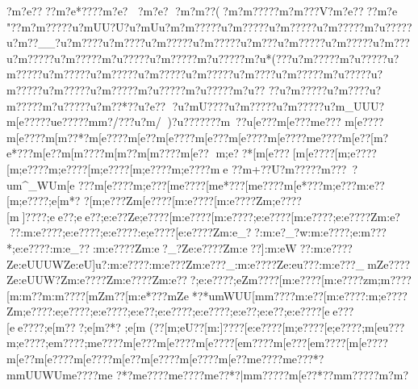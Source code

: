 {{{{{{{{{{{{{{{{{{{{{{{{{{{{{{{{{{{{{{{{{{{{{{{{{{{{{{{{{{{{{{{{{{{{{{{{{{{{{{{{{{{{{{{{{{{{{{{{{{{{{{{{{{{{{{{{{{{{{{{{{{{{{{{{{{{{{{{{{{{{{{{{{{{{{{{{{{{{{{{{{{{{{{{{{{{{{{{{{{{{{{{{{{{{{{{{{{{{{{{{{{{{{{{{{{{{{{{{{{{{{{{{{{{{{{{{{{{{{{{{{{{{{{{{{{{{{{{{{{{{{{{{{{{{{{{{{{{{{{{{{{{{{{{{{{{{{{{{{{{{{{{{{{{{{{{{{{{{{{{{{{{{{{{{{{{{{{{{{{{{{{{{{{{{{{{{{{{{{{{{{{{{{{{{{{{{{{{{{{{{{{{{{{{{{{{{{{{{{{{{{{{{{{{{{{{{{{{{{{{{{{{{{{{{{{{{{{{{{{{{{{{{{{{{{{{{{{{{{{{{{{{{{{{{{{{{{{{{{{{{{{{{{{{{{{{{{{{{{{{{{{{{{{{{{{{{{{{{{{{{{{{{{{{{{{{{{{{{{{{{{{{{{{{{{{{{{{{{{{{{{{{{{{{{{{{{{{{{{{{{{{{{{{{{{{{{{{{{{{{{{{{{{{{{{{{{{{{{{{{{{{{{{{{{{{{{{{{{{{{{{{{{{{{{{{{{{{{{{{{{{{{{{{{{{{{{{{{{{{{{{{{{{{{{{{{{{{{{{{{{{{{{{{{{{{{{{{{{{{{{{{{{{{{{{{{{{{{{{{{{{{{{{{{{{{{{{{{{{{{{{{{{{{{{{{{{{{{{{{{{{{{{{{{{{{{{{{{{{{{{{{{{{{{{ ?m?e????m?e*????m?e?
?m?e? 
?m?m??(?m?m?????m?m???V?m?e????m?e
"??m?m?????u?mUU?U?u?mUu}}?m?m?????u?m?????u?m?????u?m?????m?u?????u?m??__?u?m????u?m????u?m?????u?m?????u?m???u?m?????u?m?????u?m???u?m?????u?m?????m?u?????u?m?????m?u?????m?u*(???u?m?????m?u?????u?m?????u?m?????u?m?????u?m?????u?m?????u?m????u?m?????m?u?????u?m?????u?m?????u?m?????m?u?????m?u?????m?u?? ??u?m?????u?m????u?m?????m?u?????u?m??*??u?e?? ?u?mU????u?m?????u?m?????u?m_UUU?m[e?????u{e?????m{m?/???u?m/)?u?}?????}?m~??u[e???{m[e?? ?{m{e??? {m[e????{m[e????{m[m??*?{m[e????{m[e??{m[e????{m[e???{m[e????{m[e????{m{e????{m[e??[m?e*???{m[e??{m[m????{m[m??{m[m????{m[e??
{m;e??*[m[e???[m[e????[m;e????[m;e????{m;e????[m;e????[m;e????{m;e????{me  
??}{m+??U?}{m?????}{m???~?u{m^_WU{m[e
???{m[e????{m;e???[m{e????[m{e*???[m{e????{m[e*???{m;e ???{m:e??[m;e????;e[m*?
?[m;e}???Zm[e????[m:e????[m:e????Zm;e????[m]????;ee??;ee??;e:e??Ze;e????[m:e????[m:e????;e:e????[m:e????;e:e????Zm:e???:m:e????;e:e????;e:e????:e;e????[e:e????Zm:e_??:m:e?_?w:m:e????;e:m???*;e:e????:m:e_??:m:e????Zm:e?_?Ze:e????Zm:e??]:m:eW??:m:e????Ze:eUUUWZe:eU]u?:m:e????:m:e??}?Zm:e???_:m:e????Ze:eu???:m:e???_mZe????Ze:eUUW?Zm:e????Zm:e????Zm:e???;e:e????;eZm????[m:e????[m:e????zm;m????[m:m??{m:m????[mZm??[m:e*???{mZe*?*{u{m}WUU[m{m????{m:e??[m:e????:m;e????Zm;e????:e;e????;e:e????;e:e??;e:e????;e:e????;e:e??;e:e??;e:e????[ee???[ee????;e[m???;e[m?*? ;e[m
(??[m;eU??[m:]????[e:e????[m;e????[e;e????;m[eu???{m;e????;e{m????;m{e????{m[e???{m[e????{m[e????[e{m????{m[e???[e{m????[m[e????{m[e??{m[e????{m[e????{m[e??{m[e????{m[e????{m[e??{m{e????{m{e???*?m{mUUWU{m{e????{m{e ?*?{m{e????{m{e????{m{e??*?|m{m?????m[e??*??m{m?????m?m?
}}}}}}}}}}}}}}}}}}}}}}}}}}}}}}}}}}}}}}}}}}}}}}}}}}}}}}}}}}}}}}}}}}}}}}}}}}}}}}}}}}}}}}}}}}}}}}}}}}}}}}}}}}}}}}}}}}}}}}}}}}}}}}}}}}}}}}}}}}}}}}}}}}}}}}}}}}}}}}}}}}}}}}}}}}}}}}}}}}}}}}}}}}}}}}}}}}}}}}}}}}}}}}}}}}}}}}}}}}}}}}}}}}}}}}}}}}}}}}}}}}}}}}}}}}}}}}}}}}}}}}}}}}}}}}}}}}}}}}}}}}}}}}}}}}}}}}}}}}}}}}}}}}}}}}}}}}}}}}}}}}}}}}}}}}}}}}}}}}}}}}}}}}}}}}}}}}}}}}}}}}}}}}}}}}}}}}}}}}}}}}}}}}}}}}}}}}}}}}}}}}}}}}}}}}}}}}}}}}}}}}}}}}}}}}}}}}}}}}}}}}}}}}}}}}}}}}}}}}}}}}}}}}}}}}}}}}}}}}}}}}}}}}}}}}}}}}}}}}}}}}}}}}}}}}}}}}}}}}}}}}}}}}}}}}}}}}}}}}}}}}}}}}}}}}}}}}}}}}}}}}}}}}}}}}}}}}}}}}}}}}}}}}}}}}}}}}}}}}}}}}}}}}}}}}}}}}}}}}}}}}}}}}}}}}}}}}}}}}}}}}}}}}}}}}}}}}}}}}}}}}}}}}}}}}}}}}}}}}}}}}}}}}}}}}}}}}}}}}}}}}}}}}}}}}}}}}}}}}}}}}}}}}}}}}}}}}}}}}}}}}}}}}}}}}}}}}}}}}}}}}}}}}}}}}}}}}}}}}}}}}}}}}}}}}}}}}}}}}}}}}}}}}}}}}}}}}}}}}}}}}}}}}}}}}}}}}}}}}}}}}}}}}}}}}}}}}}}}}}}}}}}}}}}}}}}}}}}
